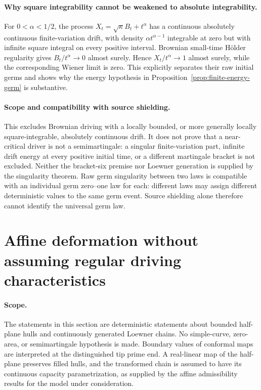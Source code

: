 \documentclass[11pt]{article}
\theoremstyle{definition}\newtheorem{definition}[theorem]{Definition}
\theoremstyle{remark}\newtheorem{remark}[theorem]{Remark}
\begin{document}
\paragraph{Why square integrability cannot be weakened to absolute integrability.}
For $0<\alpha<1/2$, the process
$X_t=\sqrt\kappa B_t+t^\alpha$ has a continuous absolutely continuous
finite-variation drift, with density $\alpha t^{\alpha-1}$ integrable
at zero but with infinite square integral on every positive interval.
Brownian small-time H\"older regularity gives
$B_t/t^\alpha\to0$ almost surely. Hence $X_t/t^\alpha\to1$ almost
surely, while the corresponding Wiener limit is zero. This explicitly
separates their raw initial germs and shows why the energy hypothesis
in Proposition~\ref{prop:finite-energy-germ} is substantive.

\paragraph{Scope and compatibility with source shielding.}
This excludes Brownian driving with a locally bounded, or more generally
locally square-integrable, absolutely continuous drift. It does not prove
that a near-critical driver is not a semimartingale: a singular
finite-variation part, infinite drift energy at every positive initial
time, or a different martingale bracket is not excluded. Neither the
bracket-six premise nor Loewner generation is supplied by the singularity
theorem. Raw germ singularity between two laws is compatible with an
individual germ zero--one law for each: different laws may assign
different deterministic values to the same germ event. Source shielding
alone therefore cannot identify the universal germ law.


\section{Affine deformation without assuming regular driving characteristics}
\label{sec:affine-beltrami-prefix}

\paragraph{Scope.}
The statements in this section are deterministic statements about bounded
half-plane hulls and continuously generated Loewner chains. No simple-curve,
zero-area, or semimartingale hypothesis is made. Boundary values of conformal
maps are interpreted at the distinguished tip prime end. A real-linear map
of the half-plane preserves filled hulls, and the transformed chain is
assumed to have its continuous capacity parametrization, as supplied by the
affine admissibility results for the model under consideration.
\end{document}

